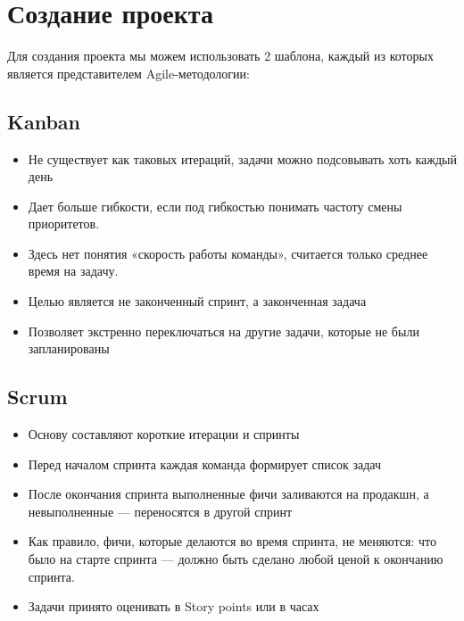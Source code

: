 \documentclass[12pt, a4paper]{article}
\begin{document}
    \newpage
    \section{Создание проекта}
    Для создания проекта мы можем использовать 2 шаблона, каждый из которых является
    представителем Agile-методологии:
    
    \begin{multicols}{2}
        \subsection{Kanban}

        \begin{itemize}
            \item Не существует как таковых итераций, задачи можно подсовывать хоть каждый день
            \item Дает больше гибкости, если под гибкостью понимать частоту смены приоритетов.
            \item Здесь нет понятия «скорость работы команды», считается только среднее время на задачу.
            \item Целью является не законченный спринт, а законченная задача 
            \item Позволяет экстренно переключаться на другие задачи, которые не были запланированы
        \end{itemize}
        
    \columnbreak

        \subsection{Scrum}

        \begin{itemize}
            \item Основу составляют короткие итерации и спринты
            \item Перед началом спринта каждая команда формирует список задач
            \item После окончания спринта выполненные фичи заливаются на продакшн, 
            а невыполненные — переносятся в другой спринт
            \item Как правило, фичи, которые делаются во время спринта, не меняются: 
            что было на старте спринта — должно быть сделано любой ценой к окончанию спринта.
            \item Задачи принято оценивать в Story points или в часах
        \end{itemize}

    \end{multicols}
\end{document}
